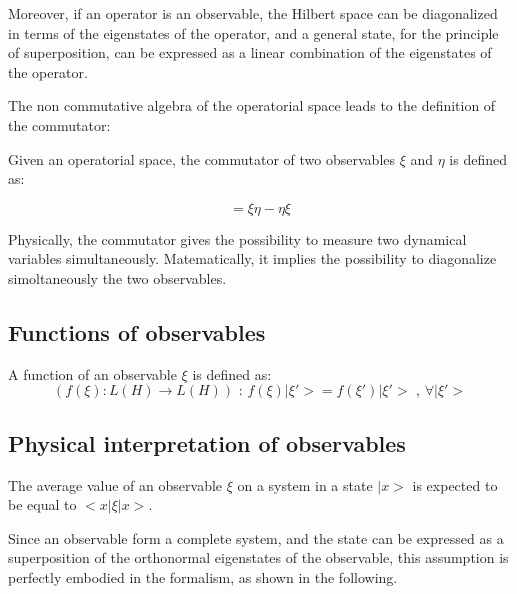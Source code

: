 \documentclass{article}
\begin{document}
Moreover, if an operator is an observable, the Hilbert space can be diagonalized in terms of the eigenstates of the operator, and a general state,
for the principle of superposition, can be expressed as a linear combination of the eigenstates of the operator.

The non commutative algebra of the operatorial space leads to the definition of the commutator:

\begin{tcolorbox}[colframe=gray!90, colback=blue!5, coltitle=white, sharp corners, title=\textbf{Definition: Commutator}, fonttitle=\large\bfseries]
    Given an operatorial space, the commutator of two observables $\xi$ and $\eta$ is defined as:

    \begin{equation}
        [\xi,\eta]=\xi\eta-\eta\xi
    \end{equation}
\end{tcolorbox}


Physically, the commutator gives the possibility to measure two dynamical variables simultaneously.
Matematically, it implies the possibility to diagonalize simoltaneously the two observables.

\subsection{Functions of observables}

\begin{tcolorbox}[colframe=gray!90, colback=blue!5, coltitle=white, title= \textbf{Definition}: Function of Observables, fonttitle=\large]
    A function of an observable $\xi$ is defined as:
    \begin{equation}
        \text{$(f(\xi): L(H) \rightarrow L(H))$ : $f(\xi)|\xi'>= f(\xi')|\xi'>$ , $\forall |\xi'>$}
    \end{equation}
\end{tcolorbox}

\subsection{Physical interpretation of observables}

The average value of an observable $\xi$ on a system in a state $|x>$ is expected to be equal to $<x|\xi|x>$.

Since an observable form a complete system, and the state can be expressed as a superposition of the orthonormal eigenstates of the observable,
this assumption is perfectly embodied in the formalism, as shown in the following.
\end{document}
